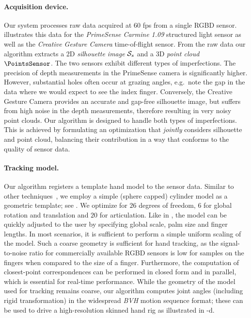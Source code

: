 \paragraph*{Acquisition device.}
Our system processes raw data acquired at 60 fps from a single RGBD sensor.  illustrates this data for the \emph{PrimeSense Carmine 1.09} structured light sensor as well as the \emph{Creative Gesture Camera} time-of-flight sensor. From the raw data our algorithm extracts a 2D \emph{silhouette image} $\mathcal{S}_{s}$ and a 3D \emph{point cloud} $\PointsSensor$. The two sensors exhibit different types of imperfections. The precision of depth measurements in the PrimeSense camera is significantly higher. However, substantial holes often occur at grazing angles, e.g.\ note the gap in the data where we would expect to see the index finger. Conversely, the Creative Gesture Camera provides an accurate and gap-free silhouette image, but suffers from high noise in the depth measurements, therefore resulting in very noisy point clouds. Our algorithm is designed to handle both types of imperfections. This is achieved by formulating an optimization that \emph{jointly} considers silhouette and point cloud, balancing their contribution in a way that conforms to the quality of sensor data.




\paragraph*{Tracking model.}
Our algorithm registers a template hand model to the sensor data. Similar to other techniques~\cite{oiko_bmvc11,schroeder_icra14}, we employ a simple (sphere capped) cylinder model as a geometric template; see .  We optimize for $26$ degrees of freedom, $6$ for global rotation and translation and $20$ for articulation.
% 
Like in \cite{melax_13}, the model can be quickly adjusted to the user by specifying global scale, palm size and finger lengths. In most scenarios, it is sufficient to perform a simple uniform scaling of the model.
% 
Such a coarse geometry is sufficient for hand tracking, as the signal-to-noise ratio for commercially available RGBD sensors is low for samples on the fingers when compared to the size of a finger. Furthermore, the computation of closest-point correspondences can be performed in closed form and in parallel, which is essential for real-time performance.
% 
% 
While the geometry of the model used for tracking remains coarse, our algorithm computes joint angles (including rigid transformation) in the widespread \emph{BVH} motion sequence format; these can be used to drive a high-resolution skinned hand rig as illustrated in -d.
%

